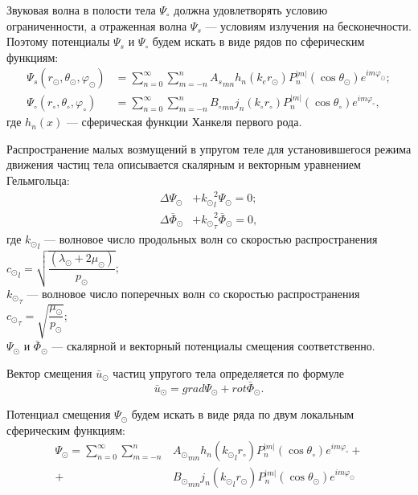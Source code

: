 Звуковая волна в полости тела $\Psi_\circ$ должна удовлетворять условию ограниченности, а отраженная волна $\Psi_s$ --- условиям излучения на бесконечности. Поэтому потенциалы $\Psi_s$ и $\Psi_\circ$ будем искать в виде рядов по сферическим функциям:
\begin{align}\Psi_s(r_\odot, \theta_\odot, \varphi_\odot) &= \sum\limits_{n = 0}^\infty \sum\limits_{m = -n}^n {A_s}_{mn} h_n(k_e r_\odot) P_n^{\lvert m\rvert}(\cos\theta_\odot) e^{im\varphi_\odot};\label{eq_psc}\\
\Psi_\circ(r_\circ, \theta_\circ, \varphi_\circ) &= \sum\limits_{n = 0}^\infty \sum\limits_{m = -n}^n {B_\circ}_{mn} j_n(k_\circ r_\circ) P_n^{\lvert m\rvert}(\cos\theta_\circ)e^{im\varphi_\circ},\label{eq_pc}
\end{align}
где $h_n(x)$ --- сферическая функции Ханкеля первого рода.

Распространение малых возмущений в упругом теле для установившегося режима движения частиц тела описывается скалярным и векторным уравнением Гельмгольца:
\begin{align}
\Delta\Psi_\odot &+ {k_\odot}_l^2\Psi_\odot = 0;\label{Helmholtz_scalar}\\
\Delta\bar{\Phi}_\odot &+ {k_\odot}_\tau^2\bar{\Phi}_\odot = 0,\label{Helmholtz_vector}
\end{align}
где ${k_\odot}_l$ --- волновое число продольных волн со скоростью распространения \break 
${c_\odot}_l = \sqrt{\dfrac{(\lambda_\odot + 2\mu_\odot)}{p_\odot}}$;\\
${k_\odot}_\tau$ --- волновое число поперечных волн со скоростью распространения \\
${c_\odot}_\tau = \sqrt{\dfrac{\mu_\odot}{p_\odot}}$;\\
$\Psi_\odot$ и $\bar{\Phi}_\odot$ --- скалярной и векторный потенциалы смещения соответственно.

Вектор смещения $\bar{u}_\odot$ частиц упругого тела определяется по формуле
$$
\bar{u}_\odot =  grad \Psi_\odot +  rot \bar{\Phi}_\odot.
$$

Потенциал смещения $\Psi_\odot$ будем искать в виде ряда по двум локальным сферическим функциям:
\begin{equation}\label{eq_ps}
\begin{split}
\Psi_\odot = \sum\limits_{n=0}^\infty \sum\limits_{m=-n}^n 
  &{A_\odot}_{mn} h_n({k_\odot}_lr_\circ)P_n^{\lvert m\rvert}(\cos\theta_\circ) e^{im\varphi_\circ} +\\
+ &{B_\odot}_{mn} j_n({k_\odot}_lr_\odot)P_n^{\lvert m\rvert}(\cos\theta_\odot) e^{im\varphi_\odot}
\end{split}
\end{equation}

